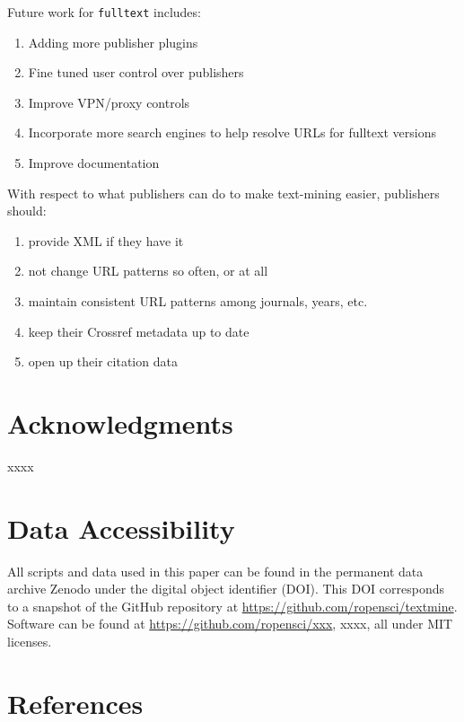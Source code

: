 \documentclass[author-year, review, 11pt]{components/elsarticle} %
\def\tightlist{}
\begin{document}
Future work for \texttt{fulltext} includes:

\begin{enumerate}
\def\labelenumi{\arabic{enumi}.}
\tightlist
\item
  Adding more publisher plugins
\item
  Fine tuned user control over publishers
\item
  Improve VPN/proxy controls
\item
  Incorporate more search engines to help resolve URLs for fulltext
  versions
\item
  Improve documentation
\end{enumerate}

With respect to what publishers can do to make text-mining easier,
publishers should:

\begin{enumerate}
\def\labelenumi{\arabic{enumi}.}
\tightlist
\item
  provide XML if they have it
\item
  not change URL patterns so often, or at all
\item
  maintain consistent URL patterns among journals, years, etc.
\item
  keep their Crossref metadata up to date
\item
  open up their citation data
\end{enumerate}

\hypertarget{acknowledgments}{%
\section{Acknowledgments}\label{acknowledgments}}

xxxx

\hypertarget{data-accessibility}{%
\section{Data Accessibility}\label{data-accessibility}}

All scripts and data used in this paper can be found in the permanent
data archive Zenodo under the digital object identifier (DOI). This DOI
corresponds to a snapshot of the GitHub repository at
\url{https://github.com/ropensci/textmine}. Software can be found at
\url{https://github.com/ropensci/xxx}, xxxx, all under MIT licenses.

\hypertarget{references}{%
\section*{References}\label{references}}
\end{document}

